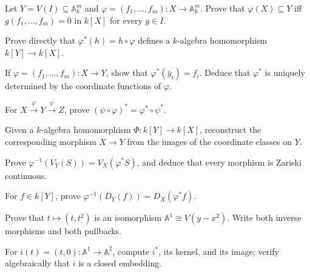 
\begin{exercise}\label{ex:vi04-target-test}
Let \(Y=V(I)\subseteq\mathbb A_k^m\) and \(\varphi=(f_1,\dots,f_m):X\to\mathbb A_k^m\).
Prove that \(\varphi(X)\subseteq Y\) iff \(g(f_1,\dots,f_m)=0\) in \(k[X]\) for every
\(g\in I\).
\end{exercise}

\begin{exercise}\label{ex:vi04-pullback}
Prove directly that \(\varphi^*(h)=h\circ\varphi\) defines a \(k\)-algebra homomorphism
\(k[Y]\to k[X]\).
\end{exercise}

\begin{exercise}\label{ex:vi04-coordinates}
If \(\varphi=(f_1,\dots,f_m):X\to Y\), show that \(\varphi^*(\bar y_i)=f_i\).  Deduce that
\(\varphi^*\) is uniquely determined by the coordinate functions of \(\varphi\).
\end{exercise}

\begin{exercise}\label{ex:vi04-contravariance}
For \(X\xrightarrow{\varphi}Y\xrightarrow{\psi}Z\), prove
\((\psi\circ\varphi)^*=\varphi^*\circ\psi^*\).
\end{exercise}

\begin{exercise}\label{ex:vi04-reconstruct}
Given a \(k\)-algebra homomorphism \(\Phi:k[Y]\to k[X]\), reconstruct the corresponding
morphism \(X\to Y\) from the images of the coordinate classes on \(Y\).
\end{exercise}

\begin{exercise}\label{ex:vi04-continuity}
Prove \(\varphi^{-1}(V_Y(S))=V_X(\varphi^*S)\), and deduce that every morphism is Zariski
continuous.
\end{exercise}

\begin{exercise}\label{ex:vi04-principal-open}
For \(f\in k[Y]\), prove \(\varphi^{-1}(D_Y(f))=D_X(\varphi^*f)\).
\end{exercise}

\begin{exercise}\label{ex:vi04-parabola}
Prove that \(t\mapsto(t,t^2)\) is an isomorphism \(\mathbb A^1\cong V(y-x^2)\).  Write both
inverse morphisms and both pullbacks.
\end{exercise}

\begin{exercise}\label{ex:vi04-axis}
For \(i(t)=(t,0):\mathbb A^1\to\mathbb A^2\), compute \(i^*\), its kernel, and its image;
verify algebraically that \(i\) is a closed embedding.
\end{exercise}

